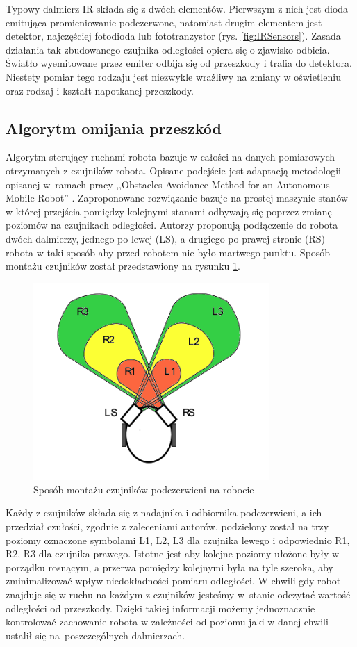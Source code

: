 Typowy dalmierz IR składa się z dwóch elementów. Pierwszym z nich jest dioda
emitująca promieniowanie podczerwone, natomiast drugim elementem jest detektor,
najczęściej fotodioda lub fototranzystor (rys. \ref{fig:IRSensors}). 
Zasada działania tak zbudowanego czujnika odległości opiera się o zjawisko odbicia. Światło wyemitowane przez
emiter odbija się od przeszkody i trafia do detektora. Niestety pomiar tego
rodzaju jest niezwykle wrażliwy na zmiany w oświetleniu oraz rodzaj i kształt
napotkanej przeszkody.
 
\subsection{Algorytm omijania przeszkód}
Algorytm sterujący ruchami robota bazuje w całości na danych pomiarowych
otrzymanych z czujników robota. Opisane podejście jest adaptacją metodologii
opisanej w~ramach pracy ,,Obstacles Avoidance Method for an Autonomous Mobile
Robot'' \cite{ObstaclesAvoidanceIR}. Zaproponowane rozwiązanie bazuje na prostej
maszynie stanów w której przejścia pomiędzy kolejnymi stanami odbywają się
poprzez zmianę poziomów na czujnikach odległości. Autorzy proponują podłączenie
do robota dwóch dalmierzy, jednego po lewej (LS), a drugiego po prawej stronie
(RS) robota w taki sposób aby przed robotem nie było martwego punktu. Sposób
montażu czujników został przedstawiony na rysunku \ref{fig:IRSensorPosition}.

\begin{figure}[h!]
 \centering
 \includegraphics[height=75mm]{../images/ch04/ir_sensor_position.png}
 \caption{Sposób montażu czujników podczerwieni na robocie \cite{ObstaclesAvoidanceIR}}
 \label{fig:IRSensorPosition}
\end{figure}

Każdy z czujników składa się z nadajnika i odbiornika podczerwieni, a ich
przedział czułości, zgodnie z zaleceniami autorów, podzielony został na trzy
poziomy oznaczone symbolami L1, L2, L3 dla czujnika lewego i odpowiednio R1, R2,
R3 dla czujnika prawego. Istotne jest aby kolejne poziomy ułożone były w porządku
rosnącym, a przerwa pomiędzy kolejnymi była na tyle szeroka, aby zminimalizować
wpływ niedokładności pomiaru odległości. W chwili gdy robot znajduje się w ruchu
na każdym z czujników jesteśmy w~stanie odczytać wartość odległości od
przeszkody. Dzięki takiej informacji możemy jednoznacznie kontrolować zachowanie
robota w zależności od poziomu jaki w danej chwili ustalił się na~poszczególnych
dalmierzach. 

